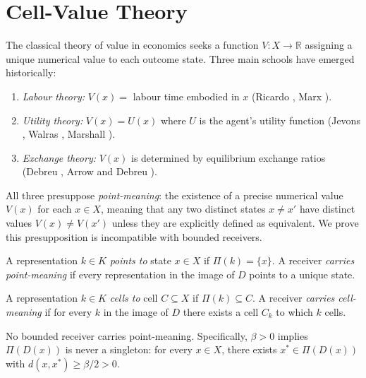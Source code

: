 \documentclass[twocolumn,11pt,a4paper]{article}
\newcommand{\R}{\mathbb{R}}
\begin{document}
\section{Cell-Value Theory}
\label{sec:cellvalue}

The classical theory of value in economics seeks a function $V\colon X\to\R$
assigning a unique numerical value to each outcome state.  Three main
schools have emerged historically:
\begin{enumerate}[label=(\roman*),leftmargin=*]
  \item \emph{Labour theory:} $V(x)=$ labour time embodied in $x$
    (Ricardo \cite{ricardo1817}, Marx \cite{marx1867}).
  \item \emph{Utility theory:} $V(x)=U(x)$ where $U$ is the agent's
    utility function (Jevons \cite{jevons1871}, Walras \cite{walras1874},
    Marshall \cite{marshall1890}).
  \item \emph{Exchange theory:} $V(x)$ is determined by equilibrium
    exchange ratios (Debreu \cite{debreu1959}, Arrow and Debreu
    \cite{arrowdebreu1954}).
\end{enumerate}
All three presuppose \emph{point-meaning}: the existence of a precise
numerical value $V(x)$ for each $x\in X$, meaning that any two distinct
states $x\neq x'$ have distinct values $V(x)\neq V(x')$ unless they are
explicitly defined as equivalent.  We prove this presupposition is
incompatible with bounded receivers.

\begin{definition}
\label{def:pointmeaning}
A representation $k\in K$ \emph{points to} state $x\in X$ if
$\Pi(k)=\{x\}$.  A receiver \emph{carries point-meaning} if every
representation in the image of $D$ points to a unique state.
\end{definition}

\begin{definition}
\label{def:cellmeaning}
A representation $k\in K$ \emph{cells to} cell $C\subseteq X$ if
$\Pi(k)\subseteq C$.  A receiver \emph{carries cell-meaning} if for
every $k$ in the image of $D$ there exists a cell $C_k$ to which $k$
cells.
\end{definition}

\begin{theorem}
\label{thm:pointforbidden}
No bounded receiver carries point-meaning.  Specifically, $\beta>0$
implies $\Pi(D(x))$ is never a singleton: for every $x\in X$, there
exists $x^*\in\Pi(D(x))$ with $d(x,x^*)\geq\beta/2>0$.
\end{theorem}
\end{document}
